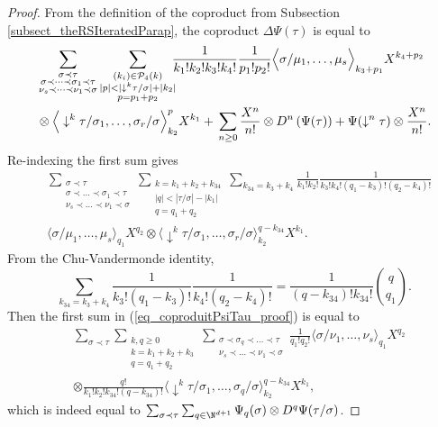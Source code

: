 \documentclass[11pt]{preprint}
\newcommand{\mcP}{\mathcal{P}}
\def\eqref#1{(\ref{#1})}
\renewcommand{\lg}{\langle}
\newcommand{\rg}{\rangle}
\begin{document}
	\begin{proof}
		From the definition of the coproduct from Subsection \ref{subsect_theRSIteratedParap}, the coproduct $\Delta\Psi(\tau)$ is equal to
		\begin{equation}\label{eq_coproduitPsiTau_proof}
			\begin{aligned}
			&\sum_{\substack{\sigma\prec\tau \\ \sigma\prec\dots\prec\sigma_1\prec\tau \\ \nu_s\prec\dots\prec\nu_1\prec\sigma }}\sum_{\substack{(k_i)\in\mcP_4(k) \\ |p|<|\downarrow^k \tau/\sigma|+|k_2| \\ p=p_1+p_2 }} \hspace{-5pt} \frac{1}{k_1!k_2!k_3!k_4!} \frac{1}{p_1!p_2!} 
			\Big\lg \sigma/\mu_1,\dots,\mu_s \Big\rg_{k_3+p_1} X^{k_4+p_2}
			\\
			& \otimes \Big\lg   \downarrow^k\tau/\sigma_1,\dots,\sigma_r/\sigma     \Big\rg^p_{k_2}X^{k_1} + \,\sum_{n\geq 0} \frac{X^n}{n!} \otimes D^n \left( \Psi(\tau)\right) + \Psi(\downarrow^n\tau)\otimes \frac{X^n}{n!} .
		\end{aligned}
	\end{equation}
		Re-indexing the first sum gives  
		\begin{align*}
			&\sum_{\substack{\sigma\prec\tau \\ \sigma\prec\dots\prec\sigma_1\prec\tau \\ \nu_s\prec\dots\prec\nu_1\prec\sigma }}\sum_{ \substack{k=k_1+k_2+k_{34} \\ |q|<|\tau/\sigma|-|k_1| \\ q=q_1+q_2}} 	\sum_{k_{34}=k_3+k_4}  \frac{1}{k_1!k_2!}
			 \frac{1}{k_3!k_4!(q_1-k_3)!(q_2-k_4)!} \\ & \Big\lg \sigma/\mu_1,\dots,\mu_s\Big\rg_{q_1} X^{q_2}
			 \otimes \Big\lg  \downarrow^k\tau/\sigma_1,\dots,\sigma_r/\sigma  \Big\rg^{q-k_{34}}_{k_2} X^{k_1}.
		\end{align*}
		From the Chu-Vandermonde identity,
		$$
		\sum_{k_{34}=k_3+k_4} \frac{1}{k_3!(q_1-k_3)!}\frac{1}{k_4!(q_2-k_4)!} = \frac{1}{(q-k_{34})!k_{34}!}  \binom{q}{q_1}.
		$$
		Then the first sum in \eqref{eq_coproduitPsiTau_proof} is equal to 
		\begin{align*}
			&\sum_{\sigma\prec\tau } \sum_{\substack{k,q\geq0 \\ k=k_1+k_2+k_3 \\ q=q_1+q_2}} \sum_{\substack{ \sigma\prec\sigma_q\prec\dots\prec\tau \\ \nu_s\prec\dots\prec\nu_1\prec\sigma   }} 	\frac{1}{q_1!q_2!}\Big\lg \sigma/\nu_1,\dots,\nu_s \Big\rg_{q_1}X^{q_2}
			\\
			& \otimes \frac{q!}{k_1!k_2!k_{34}!(q-k_{34})!}  \Big\lg \downarrow^k \tau/\sigma_1,\dots, \sigma_q/\sigma \Big\rg^{q-k_{34}}_{k_2} X^{k_1},
		\end{align*}
		which is indeed equal to $\sum_{\sigma\prec\tau}\sum_{q \in \N^{d+1}} \Psi_q(\sigma) \otimes D^q\Psi(\tau/\sigma)$.
	\end{proof}
	
\end{document}
